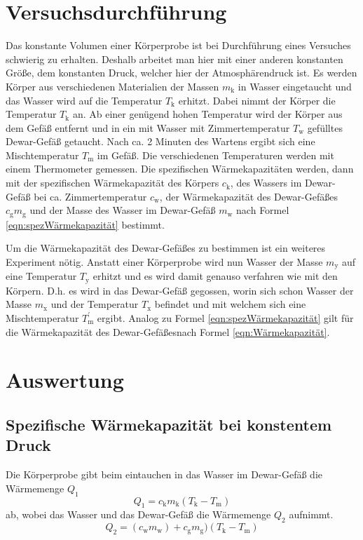 \documentclass[titlepage = firstcover]{scrartcl}
\begin{document}
    \section{Versuchsdurchführung}
        Das konstante Volumen einer Körperprobe ist bei Durchführung eines Versuches schwierig zu erhalten.
        Deshalb arbeitet man hier mit einer anderen konstanten Größe, dem konstanten Druck, welcher hier
        der Atmosphärendruck ist. Es werden Körper aus verschiedenen Materialien der Massen $m_\text{k}$ in Wasser
        eingetaucht und das Wasser wird auf die Temperatur $T_\text{k}$ erhitzt. Dabei nimmt der Körper die Temperatur $T_\text{k}$ an. Ab einer genügend hohen Temperatur
        wird der Körper aus dem Gefäß entfernt und in ein mit Wasser mit Zimmertemperatur $T_\text{w}$ gefülltes
        Dewar-Gefäß getaucht. Nach ca. 2 Minuten des Wartens ergibt sich eine Mischtemperatur $T_\text{m}$ im Gefäß.
        Die verschiedenen Temperaturen werden mit einem Thermometer gemessen.
        Die spezifischen Wärmekapazitäten werden, dann mit der spezifischen Wärmekapazität des Körpers $c_\text{k}$, des Wassers im Dewar-Gefäß bei ca. Zimmertemperatur
        $c_\text{w}$, der Wärmekapazität des Dewar-Gefäßes $c_\text{g}m_\text{g}$ und der Masse des Wasser im Dewar-Gefäß
        $m_\text{w}$ nach Formel \eqref{eqn:spezWärmekapazität} bestimmt.

        Um die Wärmekapazität des Dewar-Gefäßes zu bestimmen ist ein weiteres Experiment nötig. Anstatt einer Körperprobe
        wird nun Wasser der Masse $m_\text{y}$ auf eine Temperatur $T_\text{y}$ erhitzt und es wird damit genauso verfahren wie mit den Körpern.
        D.h. es wird in das Dewar-Gefäß gegossen, worin sich schon Wasser der Masse $m_\text{x}$ und der Temperatur
        $T_\text{x}$ befindet und mit welchem sich eine Mischtemperatur $T_\text{m}^{'}$ ergibt. Analog zu Formel
        \eqref{eqn:spezWärmekapazität} gilt für die Wärmekapazität des Dewar-Gefäßesnach Formel \eqref{eqn:Wärmekapazität}.
    

    \section{Auswertung}
        \subsection{Spezifische Wärmekapazität bei konstentem Druck}
            Die Körperprobe gibt beim eintauchen in das Wasser im Dewar-Gefäß die Wärmemenge $Q_1$
            \begin{equation*}
                Q_1 = c_\text{k}m_\text{k}(T_\text{k} - T_\text{m})
            \end{equation*}
            ab, wobei das Wasser und das Dewar-Gefäß die Wärmemenge $Q_2$ aufnimmt.
            \begin{equation*}
                Q_2 = (c_\text{w}m_\text{w}) + c_\text{g}m_\text{g})(T_\text{k} - T_\text{m})
            \end{equation*}
            
\end{document}
